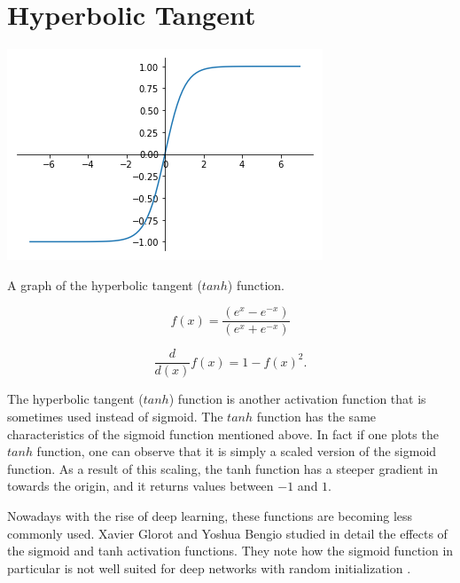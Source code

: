 \section{Hyperbolic Tangent}\label{sec:tanh}
\begin{marginfigure}
  \includegraphics{graphics/activation_functions/tanh_function.png}
  \label{fig:tanhfunction}
  \caption{
    A graph of the hyperbolic tangent ($tanh$) function.
  }
\end{marginfigure}

\begin{equation}\label{tanhfunction}
    f(x) = \frac{(e^{x} - e^{-x})}{(e^{x} + e^{-x})}
\end{equation}

\begin{equation}\label{tanhfunctionderivative}
    \frac{d}{d(x)}f(x) = 1-f(x)^2.
\end{equation}

The hyperbolic tangent ($tanh$) function is another activation function that is sometimes used instead of sigmoid. The $tanh$ function has the same characteristics of the sigmoid function mentioned above. In fact if one plots the $tanh$ function, one can observe that it is simply a scaled version of the sigmoid function. As a result of this scaling, the tanh function has a steeper gradient in towards the origin, and it returns values between $-1$ and $1$.

Nowadays with the rise of deep learning, these functions are becoming less commonly used. Xavier Glorot and Yoshua Bengio studied in detail the effects of the sigmoid and tanh activation functions. They note how the sigmoid function in particular is not well suited for deep networks with random initialization \cite{glorot2010understanding}.

